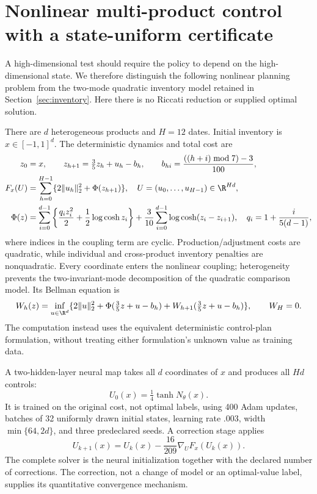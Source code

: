 \section{Nonlinear multi-product control with a state-uniform certificate}\label{sec:nonlinearinventory}
A high-dimensional test should require the policy to depend on the high-dimensional state. We therefore distinguish the following nonlinear planning problem from the two-mode quadratic inventory model retained in Section~\ref{sec:inventory}. Here there is no Riccati reduction or supplied optimal solution.

There are $d$ heterogeneous products and $H=12$ dates. Initial inventory is $x\in[-1,1]^d$. The deterministic dynamics and total cost are
\begin{align}
 z_0&=x,\qquad z_{h+1}=\tfrac35z_h+u_h-b_h,\qquad
 b_{hi}=\frac{((h+i)\bmod7)-3}{100},\label{eq:nonlineardynamics}\\
 F_x(U)&=\sum_{h=0}^{H-1}\{2\|u_h\|_2^2+\Phi(z_{h+1})\},\quad
 U=(u_0,\ldots,u_{H-1})\in\R^{Hd},\label{eq:nonlinearcost}\\
 \Phi(z)&=\sum_{i=0}^{d-1}\left\{\frac{q_i z_i^2}{2}+\frac12\log\cosh z_i\right\}
 +\frac3{10}\sum_{i=0}^{d-1}\log\cosh(z_i-z_{i+1}),\quad
 q_i=1+\frac{i}{5(d-1)},\label{eq:nonlinearpotential}
\end{align}
where indices in the coupling term are cyclic. Production/adjustment costs are quadratic, while individual and cross-product inventory penalties are nonquadratic. Every coordinate enters the nonlinear coupling; heterogeneity prevents the two-invariant-mode decomposition of the quadratic comparison model. Its Bellman equation is
\[
 W_h(z)=\inf_{u\in\R^d}\{2\|u\|_2^2+\Phi(\tfrac35z+u-b_h)+W_{h+1}(\tfrac35z+u-b_h)\},\qquad W_H=0.
\]
The computation instead uses the equivalent deterministic control-plan formulation, without treating either formulation's unknown value as training data.

A two-hidden-layer neural map takes all $d$ coordinates of $x$ and produces all $Hd$ controls:
\[
 U_0(x)=\tfrac14\tanh N_\theta(x).
\]
It is trained on the original cost, not optimal labels, using 400 Adam updates, batches of 32 uniformly drawn initial states, learning rate $.003$, width $\min\{64,2d\}$, and three predeclared seeds. A correction stage applies
\begin{equation}
 U_{k+1}(x)=U_k(x)-\frac{16}{209}\nabla_U F_x(U_k(x)).\label{eq:gradientcorrection}
\end{equation}
The complete solver is the neural initialization together with the declared number of corrections. The correction, not a change of model or an optimal-value label, supplies its quantitative convergence mechanism.

